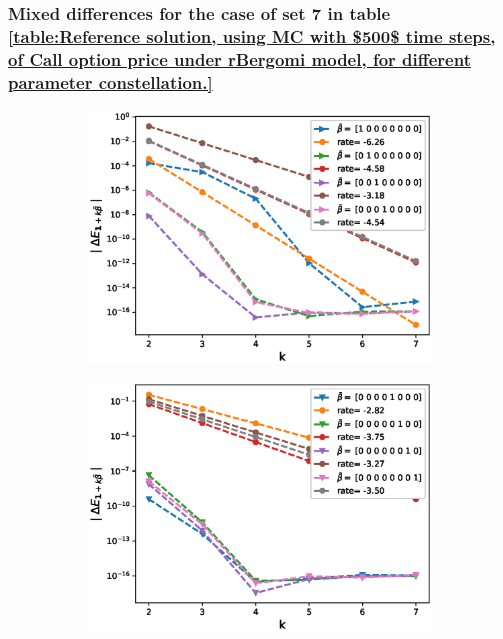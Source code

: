 \documentclass[11pt]{article}
\begin{document}
\subsubsection{Mixed differences for the case of set 7 in table \ref{table:Reference solution, using MC with $500$ time steps, of Call option price under rBergomi model, for different parameter constellation.}}\label{Mixed differences for the case of set 7}
\begin{figure}[h!]
\centering
\begin{subfigure}{.4\textwidth}
\centering
\includegraphics[width=1\linewidth]{./figures/rBergomi_mixed_error_rates/without_change_measure/N_4/H_002/first_difference_rbergomi_4steps_H_002_K_12_totally_hierarch_with_rate_W1}
\caption{}
\label{fig:sub3}
\end{subfigure}%
\begin{subfigure}{.4\textwidth}
\centering
\includegraphics[width=1\linewidth]{./figures/rBergomi_mixed_error_rates/without_change_measure/N_4/H_002/first_difference_rbergomi_4steps_H_002_K_12_totally_hierarch_with_rate_W2}
\caption{}
\label{fig:sub4}
\end{subfigure}




\end{figure}
\end{document}
